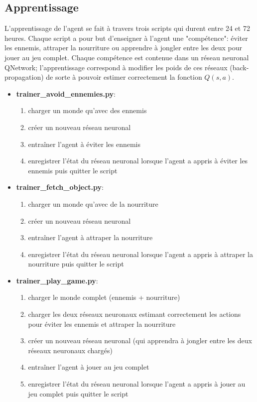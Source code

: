\documentclass[11pt,a4paper]{report}
\begin{document}
  \subsection{Apprentissage}
    
  \par L'apprentissage de l'agent se fait à travers trois scripts qui durent entre 24 et 72 heures. Chaque script a pour but d'enseigner à l'agent une "compétence": éviter les ennemis, attraper la nourriture ou apprendre à jongler entre les deux pour jouer au jeu complet. Chaque compétence est contenue dans un réseau neuronal QNetwork; l'apprentissage correspond à modifier les poids de ces réseaux (back-propagation) de sorte à pouvoir estimer correctement la fonction $Q(s,a)$.

  \renewcommand{\labelitemi}{\textbullet}
  \begin{itemize}
  \item \textbf{trainer\_avoid\_ennemies.py}: 
      \begin{enumerate}
      \item charger un monde qu'avec des ennemis
      \item créer un nouveau réseau neuronal 
      \item entraîner l'agent à éviter les ennemis
      \item enregistrer l'état du réseau neuronal lorsque l'agent  a appris à éviter les ennemis puis quitter le script
      \end{enumerate}
  \item \textbf{trainer\_fetch\_object.py}: 
      \begin{enumerate}
      \item charger un monde qu'avec de la nourriture
      \item créer un nouveau réseau neuronal
      \item entraîner l'agent à attraper la nourriture
      \item enregistrer l'état du réseau neuronal lorsque l'agent  a appris à attraper la nourriture puis quitter le script
      \end{enumerate}  
  \item \textbf{trainer\_play\_game.py}:
      \begin{enumerate}
      \item charger le monde complet (ennemis + nourriture)
      \item charger les deux réseaux neuronaux estimant correctement les actions pour éviter les ennemis et attraper la nourriture
      \item créer un nouveau réseau neuronal (qui apprendra à jongler entre les deux réseaux neuronaux chargés)
      \item entraîner l'agent à jouer au jeu complet
      \item enregistrer l'état du réseau neuronal lorsque l'agent  a appris à jouer au jeu complet puis quitter le script
      \end{enumerate}
  \end{itemize}
  
\end{document}
